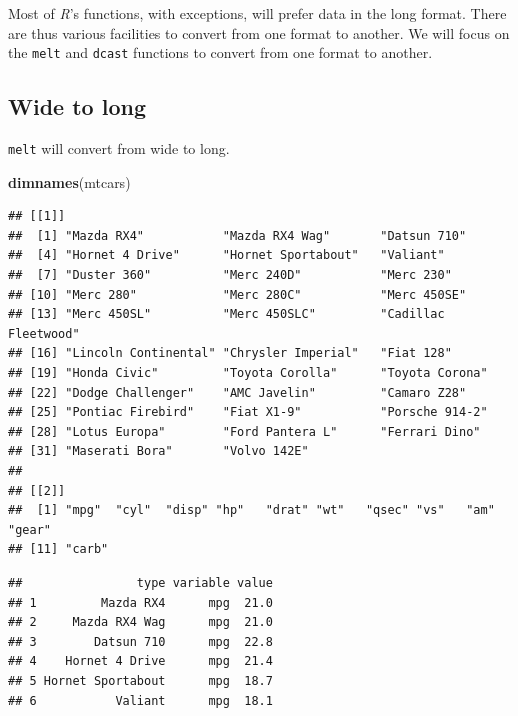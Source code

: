 \documentclass[]{book}
\newenvironment{Shaded}{\begin{snugshade}}{\end{snugshade}}
\newcommand{\KeywordTok}[1]{\textcolor[rgb]{0.13,0.29,0.53}{\textbf{#1}}}
\newcommand{\DataTypeTok}[1]{\textcolor[rgb]{0.13,0.29,0.53}{#1}}
\newcommand{\StringTok}[1]{\textcolor[rgb]{0.31,0.60,0.02}{#1}}
\newcommand{\OperatorTok}[1]{\textcolor[rgb]{0.81,0.36,0.00}{\textbf{#1}}}
\newcommand{\NormalTok}[1]{#1}
\theoremstyle{definition}
\theoremstyle{definition}
\theoremstyle{definition}
\theoremstyle{remark}
\begin{document}
Most of \emph{R}'s functions, with exceptions, will prefer data in the
long format. There are thus various facilities to convert from one
format to another. We will focus on the \texttt{melt} and \texttt{dcast}
functions to convert from one format to another.

\subsection{Wide to long}\label{wide-to-long}

\texttt{melt} will convert from wide to long.

\begin{Shaded}
\begin{Highlighting}[]
\KeywordTok{dimnames}\NormalTok{(mtcars)}
\end{Highlighting}
\end{Shaded}

\begin{verbatim}
## [[1]]
##  [1] "Mazda RX4"           "Mazda RX4 Wag"       "Datsun 710"         
##  [4] "Hornet 4 Drive"      "Hornet Sportabout"   "Valiant"            
##  [7] "Duster 360"          "Merc 240D"           "Merc 230"           
## [10] "Merc 280"            "Merc 280C"           "Merc 450SE"         
## [13] "Merc 450SL"          "Merc 450SLC"         "Cadillac Fleetwood" 
## [16] "Lincoln Continental" "Chrysler Imperial"   "Fiat 128"           
## [19] "Honda Civic"         "Toyota Corolla"      "Toyota Corona"      
## [22] "Dodge Challenger"    "AMC Javelin"         "Camaro Z28"         
## [25] "Pontiac Firebird"    "Fiat X1-9"           "Porsche 914-2"      
## [28] "Lotus Europa"        "Ford Pantera L"      "Ferrari Dino"       
## [31] "Maserati Bora"       "Volvo 142E"         
## 
## [[2]]
##  [1] "mpg"  "cyl"  "disp" "hp"   "drat" "wt"   "qsec" "vs"   "am"   "gear"
## [11] "carb"
\end{verbatim}

\begin{Shaded}
\end{Shaded}

\begin{verbatim}
##                type variable value
## 1         Mazda RX4      mpg  21.0
## 2     Mazda RX4 Wag      mpg  21.0
## 3        Datsun 710      mpg  22.8
## 4    Hornet 4 Drive      mpg  21.4
## 5 Hornet Sportabout      mpg  18.7
## 6           Valiant      mpg  18.1
\end{verbatim}
\end{document}
